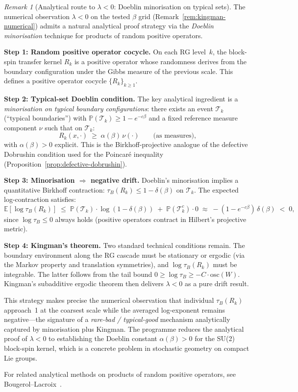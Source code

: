 \documentclass[12pt,a4paper]{article}
\theoremstyle{definition}
\theoremstyle{plain}
\theoremstyle{remark}
\newtheorem{remark}[definition]{Remark}
\begin{document}
\begin{remark}[Analytical route to $\lambda < 0$: Doeblin minorisation on typical sets]
\label{rem:doeblin-analytical}
The numerical observation $\lambda < 0$ on the tested $\beta$ grid (Remark~\ref{rem:kingman-numerical}) admits a natural analytical proof strategy via the \emph{Doeblin minorisation} technique for products of random positive operators.

\textbf{Step 1: Random positive operator cocycle.} On each RG level~$k$, the block-spin transfer kernel $R_k$ is a positive operator whose randomness derives from the boundary configuration under the Gibbs measure of the previous scale. This defines a positive operator cocycle $\{R_k\}_{k \geq 1}$.

\textbf{Step 2: Typical-set Doeblin condition.} The key analytical ingredient is a \emph{minorisation on typical boundary configurations}: there exists an event $\mathcal{T}_k$ (``typical boundaries'') with $\mathbb{P}(\mathcal{T}_k) \geq 1 - e^{-c\beta}$ and a fixed reference measure component $\nu$ such that on $\mathcal{T}_k$:
\[
R_k(x, \cdot) \;\geq\; \alpha(\beta)\, \nu(\cdot) \qquad \text{(as measures),}
\]
with $\alpha(\beta) > 0$ explicit. This is the Birkhoff-projective analogue of the defective Dobrushin condition used for the Poincar\'e inequality (Proposition~\ref{prop:defective-dobrushin}).

\textbf{Step 3: Minorisation $\Rightarrow$ negative drift.} Doeblin's minorisation implies a quantitative Birkhoff contraction: $\tau_B(R_k) \leq 1 - \delta(\beta)$ on $\mathcal{T}_k$. The expected log-contraction satisfies:
\[
\mathbb{E}[\log \tau_B(R_k)] \;\leq\; \mathbb{P}(\mathcal{T}_k) \cdot \log(1 - \delta(\beta)) \;+\; \mathbb{P}(\mathcal{T}_k^c) \cdot 0 \;\approx\; -(1 - e^{-c\beta})\, \delta(\beta) \;<\; 0,
\]
since $\log \tau_B \leq 0$ always holds (positive operators contract in Hilbert's projective metric).

\textbf{Step 4: Kingman's theorem.}
Two standard technical conditions remain.
The boundary environment along the RG cascade must be stationary or ergodic
(via the Markov property and translation symmetries), and
$\log \tau_B(R_k)$ must be integrable.
The latter follows from the tail bound
$0 \geq \log \tau_B \geq -C \cdot \mathrm{osc}(W)$.
Kingman's subadditive ergodic theorem then delivers $\lambda < 0$ as a pure
drift result.

This strategy makes precise the numerical observation that individual $\tau_B(R_k)$ approach~1 at the coarsest scale while the averaged log-exponent remains negative---the signature of a \emph{rare-bad / typical-good} mechanism analytically captured by minorisation plus Kingman. The programme reduces the analytical proof of $\lambda < 0$ to establishing the Doeblin constant $\alpha(\beta) > 0$ for the SU(2) block-spin kernel, which is a concrete problem in stochastic geometry on compact Lie groups.

For related analytical methods on products of random positive operators, see Bougerol--Lacroix~\cite{BougerolLacroix1985}.
\end{remark}
\end{document}
